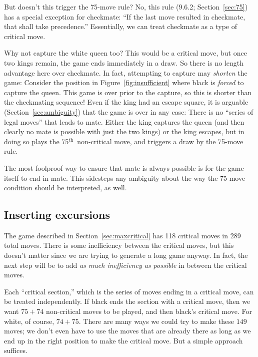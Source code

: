 \documentclass[twocolumn]{article}
\renewcommand\th{$^{\mathrm{th}}$}
\begin{document}
But doesn't this trigger the 75-move rule? No, this rule (9.6.2;
Section~\ref{sec:75}) has a special exception for checkmate: ``If the
last move resulted in checkmate, that shall take precedence.''
Essentially, we can treat checkmate as a type of critical move.

Why not capture the white queen too? This would be a critical move,
but once two kings remain, the game ends immediately in a draw. So
there is no length advantage here over checkmate. In fact, attempting
to capture may {\em shorten} the game: Consider the position in
Figure~\ref{fig:insufficient} where black is {\em forced} to capture
the queen. This game is over prior to the capture, so this is shorter
than the checkmating sequence! Even if the king had an escape square,
it is arguable (Section~\ref{sec:ambiguity}) that the game is over in
any case: There is no ``series of legal moves'' that leads to mate.
Either the king captures the queen (and then clearly no mate is
possible with just the two kings) or the king escapes, but in doing so
plays the 75\th\ non-critical move, and triggers a draw by the 75-move
rule.

The most foolproof way to ensure that mate is always possible is for the
game itself to end in mate. This sidesteps any ambiguity about the way
the 75-move condition should be interpreted, as well.


\subsection{Inserting excursions} \label{sec:excursions}

The game described in Section~\ref{sec:maxcritical} has 118 critical
moves in 289 total moves. There is some inefficiency between the
critical moves, but this doesn't matter since we are trying to generate
a long game anyway. In fact, the next step will be to add {\em as much
  inefficiency as possible} in between the critical moves.


Each ``critical section,'' which is the series of moves ending in a
critical move, can be treated independently. If black ends the section
with a critical move, then we want $75+74$ non-critical moves to be
played, and then black's critical move. For white, of course, $74+75$.
There are many ways we could try to make these $149$ moves; we don't
even have to use the moves that are already there as long as we end
up in the right position to make the critical move. But a simple
approach suffices.
\end{document}
